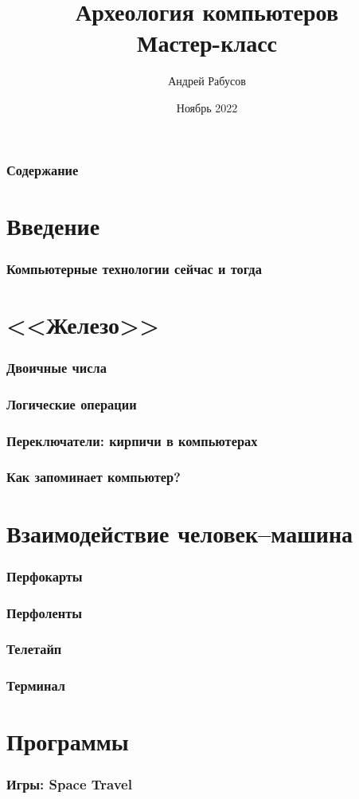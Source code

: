 \documentclass[t,aspectratio=169]{beamer}
\author{Андрей Рабусов}
\date{Ноябрь 2022}
\title{Археология компьютеров\\
Мастер-класс}
\begin{document}
\begin{frame}
    \frametitle{Содержание}
    \tableofcontents[sectionstyle=show,subsectionstyle=show]
\end{frame}

\section*{Введение}
\begin{frame}
    \frametitle{Компьютерные технологии сейчас и тогда}
\end{frame}

\section{<<Железо>>}
\begin{frame}
    \frametitle{Двоичные числа}
\end{frame}

\begin{frame}
    \frametitle{Логические операции}
\end{frame}

\begin{frame}
    \frametitle{Переключатели: кирпичи в компьютерах}
\end{frame}

\begin{frame}
    \frametitle{Как запоминает компьютер?}
\end{frame}

\section{Взаимодействие человек--машина}
\begin{frame}
    \frametitle{Перфокарты}
\end{frame}

\begin{frame}
    \frametitle{Перфоленты}
\end{frame}

\begin{frame}
    \frametitle{Телетайп}
\end{frame}

\begin{frame}
    \frametitle{Терминал}
\end{frame}

\section{Программы}
\begin{frame}
    \frametitle{Игры: Space Travel}
\end{frame}
\end{document}
